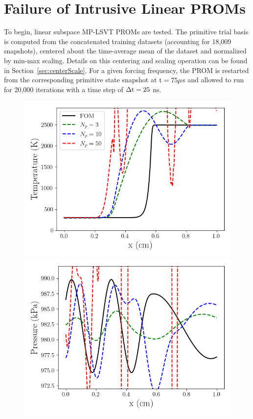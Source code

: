 \section{Failure of Intrusive Linear PROMs}

To begin, linear subspace MP-LSVT PROMs are tested. The primitive trial basis is computed from the concatenated training datasets (accounting for 18,009 snapshots), centered about the time-average mean of the dataset and normalized by min-max scaling. Details on this centering and scaling operation can be found in Section~\ref{sec:centerScale}. For a given forcing frequency, the PROM is restarted from the corresponding primitive state snapshot at $\text{t} = 75 \mu$s and allowed to run for 20,000 iterations with a time step of $\Delta \text{t} = 25$ ns.

\begin{figure}
    \begin{minipage}{0.49\linewidth}
        \includegraphics[width=0.99\linewidth]{Chapters/TransientFlame/Images/linear/rom_temp_snaps.png}
    \end{minipage}
    \begin{minipage}{0.49\linewidth}
        \includegraphics[width=0.99\linewidth]{Chapters/TransientFlame/Images/linear/rom_press_snaps.png}

\end{minipage}
\end{figure}
